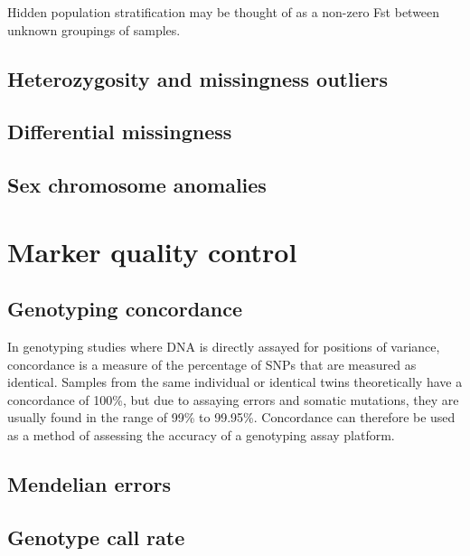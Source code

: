\documentclass[
]{book}
\begin{document}
Hidden population stratification may be thought of as a non-zero Fst between unknown groupings of samples.

\hypertarget{heterozygosity-and-missingness-outliers}{%
\subsection{Heterozygosity and missingness outliers}\label{heterozygosity-and-missingness-outliers}}

\hypertarget{differential-missingness}{%
\subsection{Differential missingness}\label{differential-missingness}}

\hypertarget{sex-chromosome-anomalies}{%
\subsection{Sex chromosome anomalies}\label{sex-chromosome-anomalies}}

\hypertarget{marker-quality-control}{%
\section{Marker quality control}\label{marker-quality-control}}

\hypertarget{genotyping-concordance}{%
\subsection{Genotyping concordance}\label{genotyping-concordance}}

In genotyping studies where DNA is directly assayed for positions of variance, concordance is a measure of the percentage of SNPs that are measured as identical. Samples from the same individual or identical twins theoretically have a concordance of 100\%, but due to assaying errors and somatic mutations, they are usually found in the range of 99\% to 99.95\%. Concordance can therefore be used as a method of assessing the accuracy of a genotyping assay platform.

\hypertarget{mendelian-errors}{%
\subsection{Mendelian errors}\label{mendelian-errors}}

\hypertarget{genotype-call-rate}{%
\subsection{Genotype call rate}\label{genotype-call-rate}}
\end{document}
